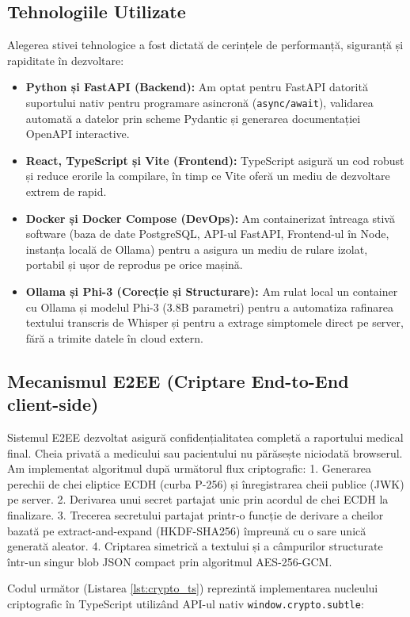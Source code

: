 \subsection{Tehnologiile Utilizate}
Alegerea stivei tehnologice a fost dictată de cerințele de performanță, siguranță și rapiditate în dezvoltare:
\begin{itemize}
    \item \textbf{Python și FastAPI (Backend):} Am optat pentru FastAPI datorită suportului nativ pentru programare asincronă (\texttt{async/await}), validarea automată a datelor prin scheme Pydantic și generarea documentației OpenAPI interactive.
    \item \textbf{React, TypeScript și Vite (Frontend):} TypeScript asigură un cod robust și reduce erorile la compilare, în timp ce Vite oferă un mediu de dezvoltare extrem de rapid.
    \item \textbf{Docker și Docker Compose (DevOps):} Am containerizat întreaga stivă software (baza de date PostgreSQL, API-ul FastAPI, Frontend-ul în Node, instanța locală de Ollama) pentru a asigura un mediu de rulare izolat, portabil și ușor de reprodus pe orice mașină.
    \item \textbf{Ollama și Phi-3 (Corecție și Structurare):} Am rulat local un container cu Ollama și modelul Phi-3 (3.8B parametri) pentru a automatiza rafinarea textului transcris de Whisper și pentru a extrage simptomele direct pe server, fără a trimite datele în cloud extern.
\end{itemize}

\subsection{Mecanismul E2EE (Criptare End-to-End client-side)}
Sistemul E2EE dezvoltat asigură confidențialitatea completă a raportului medical final. Cheia privată a medicului sau pacientului nu părăsește niciodată browserul. 
Am implementat algoritmul după următorul flux criptografic:
1. Generarea perechii de chei eliptice ECDH (curba P-256) și înregistrarea cheii publice (JWK) pe server.
2. Derivarea unui secret partajat unic prin acordul de chei ECDH la finalizare.
3. Trecerea secretului partajat printr-o funcție de derivare a cheilor bazată pe extract-and-expand (HKDF-SHA256) împreună cu o sare unică generată aleator.
4. Criptarea simetrică a textului și a câmpurilor structurate într-un singur blob JSON compact prin algoritmul AES-256-GCM.

Codul următor (Listarea \ref{lst:crypto_ts}) reprezintă implementarea nucleului criptografic în TypeScript utilizând API-ul nativ \texttt{window.crypto.subtle}:

